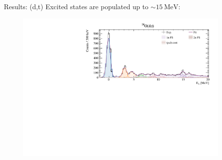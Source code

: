 \documentclass[aspectratio=43, dvipsnames]{beamer}
\newcommand{\iso}[2]{\ce{^{#1}#2}}
\begin{document}
\begin{frame}{Results: \iso{20}{O}(d,t)}
	Excited states are populated up to $\sim\qty{15}{\MeV}$:
	\begin{figure}
		\includegraphics[width=0.95\textwidth]{figures/dt_xs.pdf}
	\end{figure}
\end{frame}
\end{document}
